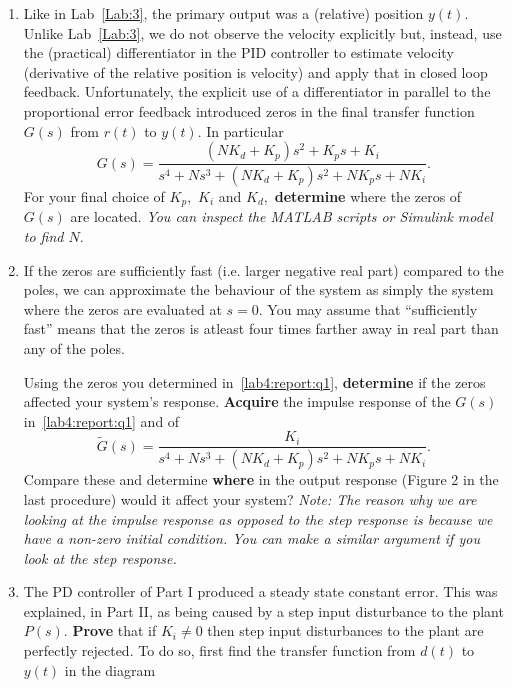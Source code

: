 \begin{deliverable}[label={lab4:report}]
  \begin{enumerate}[label={(\arabic*)}]
    \item{%
      Like in Lab~\ref{Lab:3}, the primary output was a (relative) position \(y(t).\)
      Unlike Lab~\ref{Lab:3}, we do not observe the velocity explicitly but, instead, use the (practical) differentiator in the PID controller to estimate velocity (derivative of the relative position is velocity) and apply that in closed loop feedback.
      Unfortunately, the explicit use of a differentiator in parallel to the proportional error feedback introduced zeros in the final transfer function \(G(s)\) from \(r(t)\) to \(y(t).\)
      In particular
      \[
        G(s) =
          \frac{
            (N K_d + K_p) s^2 + K_p s + K_i
          }{
            s^4 + N s^3 + (N K_d + K_p) s^2 + N K_p s + N K_i
          }.
      \]
      For your final choice of \(K_p,\) \(K_i\) and \(K_d,\) \textbf{determine} where the zeros of \(G(s)\) are located.
      \emph{You can inspect the MATLAB scripts or Simulink model to find \(N.\)}
      \label{lab4:report:q1}
    }
    \item{%
      If the zeros are sufficiently fast (i.e. larger negative real part) compared to the poles, we can approximate the behaviour of the system as simply the system where the zeros are evaluated at \(s = 0.\)
      You may assume that ``sufficiently fast'' means that the zeros is atleast four times farther away in real part than any of the poles.

      Using the zeros you determined in~\ref{lab4:report:q1}, \textbf{determine} if the zeros affected your system's response.
      \textbf{Acquire} the impulse response of the \(G(s)\) in~\ref{lab4:report:q1}
      and of
      \[
        \tilde{G}(s)
          =
            \frac{K_i}{
              s^4 + N s^3 + (N K_d + K_p) s^2 + N K_p s + N K_i
            }.
      \]
      Compare these and determine \textbf{where} in the output response (Figure 2 in the last procedure) would it affect your system?
      \emph{Note: The reason why we are looking at the impulse response as opposed to the step response is because we have a non-zero initial condition. You can make a similar argument if you look at the step response.}
      \label{lab4:report:q2}
    }
    \item{%
      The PD controller of Part I produced a steady state constant error.
      This was explained, in Part II, as being caused by a step input disturbance to the plant \(P(s).\)
      \textbf{Prove} that if \(K_i \neq 0\) then step input disturbances to the plant are perfectly rejected.
      To do so, first find the transfer function from \(d(t)\) to \(y(t)\) in the diagram
      \begin{center}
        \begin{tikzpicture}[x=1in, y=1in]


\end{tikzpicture}
\end{center}}
\end{enumerate}
\end{deliverable}
